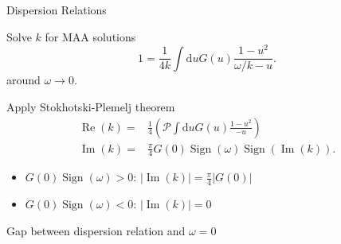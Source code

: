 \begin{frame}{Dispersion Relations}

Solve $k$ for MAA solutions
\begin{equation*}
   1 = \frac{1}{4k} \int \mathrm du G(u) \frac{ 1 - u^2 }{ \omega/k - u }.
\end{equation*}
around  $\omega\to 0$.

\pause

Apply Stokhotski-Plemelj theorem
\begin{align*}
\operatorname{Re}(k) =& \frac{1}{4}\left(  \mathcal{P} \int \mathrm d u G(u) \frac{ 1 - u^2 }{ - u }  \right)\label{eqn-re-k-arbitrary-spectrum} \\
\operatorname{Im}(k) =&  \frac{\pi}{4}G(0) \operatorname{Sign}\left( \omega \right) \operatorname{Sign}\left(  \operatorname{Im}(k)  \right).
\end{align*}

\pause

\begin{itemize}
   \item $G(0) \operatorname{Sign}(\omega) > 0$: $\lvert \operatorname{Im}(k) \rvert  =  \frac{\pi}{4}\lvert G(0)\rvert$
   \item $G(0) \operatorname{Sign}(\omega) < 0$: $\lvert \operatorname{Im}(k) \rvert  = 0$
\end{itemize}

\pause
\begin{tcolorbox}
   Gap between dispersion relation and $\omega=0$
\end{tcolorbox}


%
%




\end{frame}






